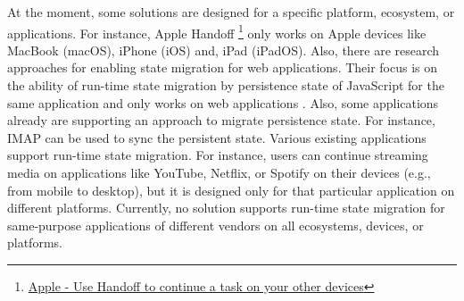 At the moment, some solutions are designed for a specific platform, ecosystem, or applications.
For instance, Apple Handoff \footnote{\href{https://support.apple.com/en-us/HT209455}{Apple - Use Handoff to continue a task on your other devices}} only works on Apple devices like MacBook (macOS), iPhone (iOS) and, iPad (iPadOS).
Also, there are research approaches for enabling state migration for web applications.
Their focus is on the ability of run-time state migration by persistence state of JavaScript for the same application and only works on web applications  \cite{javascript-migration}. Also, some applications already are supporting an approach to migrate persistence state. For instance, IMAP can be used to sync the persistent state.
Various existing applications support run-time state migration.
For instance, users can continue streaming media on applications like YouTube, Netflix, or Spotify on their devices (e.g., from mobile to desktop), but it is designed only for that particular application on different platforms.
Currently, no solution supports run-time state migration for same-purpose applications of different vendors on all ecosystems, devices, or platforms.
